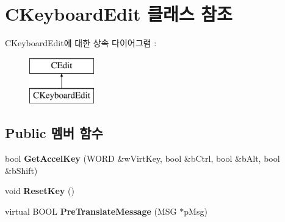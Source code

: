 \hypertarget{class_c_keyboard_edit}{}\section{C\+Keyboard\+Edit 클래스 참조}
\label{class_c_keyboard_edit}
C\+Keyboard\+Edit에 대한 상속 다이어그램 \+: \begin{figure}[H]
\begin{center}
\leavevmode
\includegraphics[height=2.000000cm]{class_c_keyboard_edit}
\end{center}
\end{figure}
\subsection*{Public 멤버 함수}
\begin{DoxyCompactItemize}
\item 
\mbox{\label{class_c_keyboard_edit_a920dfccebef5e2260e59003e4959ef9f}} 
bool {\bfseries Get\+Accel\+Key} (W\+O\+RD \&w\+Virt\+Key, bool \&b\+Ctrl, bool \&b\+Alt, bool \&b\+Shift)
\item 
\mbox{\label{class_c_keyboard_edit_ad0185cc0cad77250cc32ef1d9ffb8593}} 
void {\bfseries Reset\+Key} ()
\item 
\mbox{\label{class_c_keyboard_edit_a7700247028b07400adf5056c6627e19a}} 
virtual B\+O\+OL {\bfseries Pre\+Translate\+Message} (M\+SG $\ast$p\+Msg)
\end{DoxyCompactItemize}
